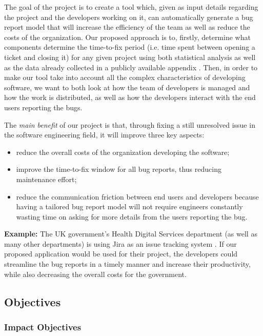 \documentclass[11pt,english,twocolumn]{article}
\begin{document}
The goal of the project is to create a tool which, given as input details
regarding the project and the developers working on it, can automatically
generate a bug report model that will increase the efficiency of the team
as well as reduce the costs of the organization. Our proposed approach is to,
firstly, determine what components determine the time-to-fix period (i.e. time spent
between opening a ticket and closing it) for any given project using both
statistical analysis as well as the data already collected in a publicly 
available appendix \cite{breu2009appendix}. 
Then, in order to make our tool take into account all the complex characteristics
of developing software, we want to both look at how the team of developers is 
managed and how the work is distributed, as well as how the developers interact
with the end users reporting the bugs.

The \emph{main benefit} of our project is that, through fixing a still
unresolved issue in the software engineering field, it will improve three 
key aspects:

\begin{itemize}
	\item reduce the overall costs of the organization developing the software;
	\item improve the time-to-fix window for all bug reports, thus reducing
	maintenance effort;
	\item reduce the communication friction between end users and developers
	because having a tailored bug report model will not require engineers
	constantly wasting time on asking for more details from the users reporting
	the bug.
\end{itemize}

\textbf{Example:} The UK government's Health Digital Services department (as well
as many other departments) is using Jira as an issue tracking system \cite{gov-uk-jira}. 
If our proposed application would be used for their project, the developers 
could streamline the bug reports in a timely manner and increase their productivity,
while also decreasing the overall costs for the government.

\subsection*{Objectives}

\subsubsection*{Impact Objectives}
\end{document}
